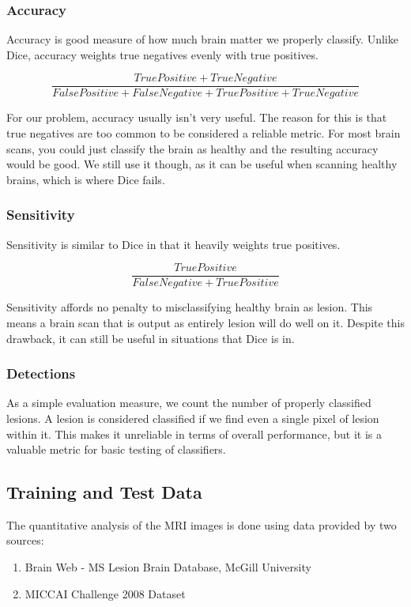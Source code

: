 \documentclass{article} %
\begin{document}
\subsubsection{Accuracy}
Accuracy is good measure of how much brain matter we properly classify. Unlike Dice, accuracy weights true negatives evenly with true positives.

$$\frac{True Positive + True Negative}{False Positive + False Negative + True Positive + True Negative}$$

For our problem, accuracy usually isn't very useful. The reason for this is that true negatives are too common to be considered a reliable metric. For most brain scans, you could just classify the brain as healthy and the resulting accuracy would be good. We still use it though, as it can be useful when scanning healthy brains, which is where Dice fails.

\subsubsection{Sensitivity}

Sensitivity is similar to Dice in that it heavily weights true positives.

$$\frac{True Positive}{False Negative + True Positive}$$

Sensitivity affords no penalty to misclassifying healthy brain as lesion. This means a brain scan that is output as entirely lesion will do well on it. Despite this drawback, it can still be useful in situations that Dice is in.

\subsubsection{Detections}

As a simple evaluation measure, we count the number of properly classified lesions. A lesion is considered classified if we find even a single pixel of lesion within it. This makes it unreliable in terms of overall performance, but it is a valuable metric for basic testing of classifiers.

\subsection{Training and Test Data}
The quantitative analysis of the MRI images is done using data provided by two sources:
\begin{enumerate}
\item Brain Web - MS Lesion Brain Database, McGill University
\item MICCAI Challenge 2008 Dataset
\end{enumerate}
\end{document}
